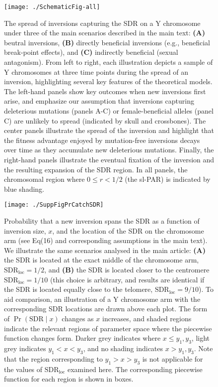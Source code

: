 \documentclass{article}
\begin{document}
\begin{figure}[htbp]
 \centering
 \texttt{[image: ./SchematicFig-all]}
 \caption{The spread of inversions capturing the SDR on a Y chromosome under three of the main scenarios described in the main text: \textbf{(A)} beutral inversions, \textbf{(B)} directly beneficial inversions (e.g., beneficial break-point effects), and \textbf{(C)} indirectly beneficial (sexual antagonism). From left to right, each illustration depicts a sample of Y chromosomes at three time points during the spread of an inversion, highlighting several key features of the theoretical models. The left-hand panels show key outcomes when new inversions first arise, and emphasize our assumption that inversions capturing deleterious mutations (panels A-C) or female-beneficial alleles (panel C) are unlikely to spread (indicated by skull and crossbones). The center panels illustrate the spread of the inversion and highlight that the fitness advantage enjoyed by mutation-free inversions decays over time as they accumulate new deleterious mutations. Finally, the right-hand panels illustrate the eventual fixation of the inversion and the resulting expansion of the SDR region. In all panels, the chromosomal region where $0 \leq r < 1/2$ (the sl-PAR) is indicated by blue shading.}
 \label{fig:diagramFig}
 \end{figure}

\newpage


\begin{figure}[htbp]
 \centering
 \texttt{[image: ./SuppFigPrCatchSDR]}
 \caption{Probability that a new inversion spans the SDR as a function of inversion size, $x$, and the location of the SDR on the chromosome arm (see Eq(16) and corresponding assumptions in the main text). We illustrate the same scenarios analysed in the main article: \textbf{(A)} the SDR is located at the exact middle of the chromosome arm, $\text{SDR}_\text{loc} = 1/2$, and \textbf{(B)} the SDR is located closer to the centromere $\text{SDR}_\text{loc} = 1/10$ (this choice is arbitrary, and results are identical if the SDR is located equally close to the telomere, $\text{SDR}_\text{loc} = 9/10$). To aid comparison, an illustration of a Y chromosome arm with the corresponding SDR locations are drawn above each plot. The form of $\Pr (\text{SDR} \mid x)$ changes as $x$ increases, and shaded regions indicate the relevant regions of parameter space where the piecewise function changes form. Darker grey indicates where $x \leq y_1,y_3$, light grey indicates $y_1 < x < y_3$, and no shading indicates $x > y_1, y_3$. Note that the region corresponding to $y_1 > x > y_3$ is not applicable for the values of $\text{SDR}_\text{loc}$ examined here. The corresponding piecewise function for each region is shown in boxes.}
 \label{fig:PrCatchFixFig}
 \end{figure}




\newpage
\end{document}
